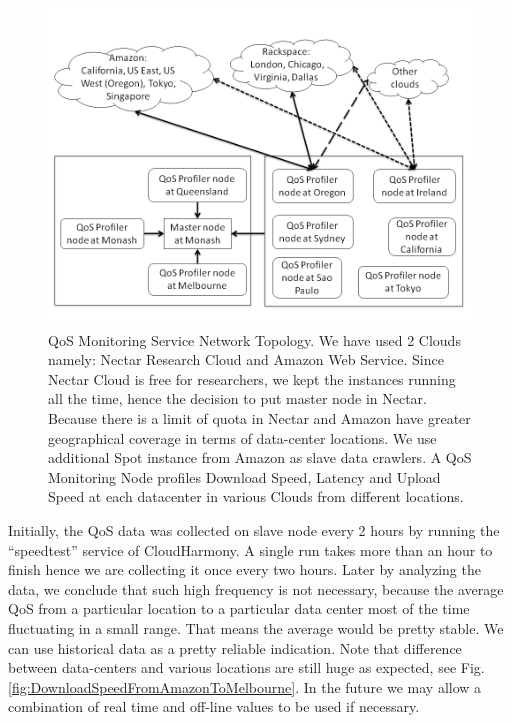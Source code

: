\begin{figure}[!ht]
 \centering
 \includegraphics[width=\textwidth,keepaspectratio]{Figures/QoS/figure2.png}
 \caption{QoS Monitoring Service Network Topology. We have used 2 Clouds namely: Nectar Research Cloud and Amazon Web Service. Since Nectar Cloud is free for researchers, we kept the instances running all the time, hence the decision to put master node in Nectar. Because there is a limit of quota in Nectar and Amazon have greater geographical coverage in terms of data-center locations. We use additional Spot instance from Amazon as slave data crawlers. A QoS Monitoring Node profiles Download Speed, Latency and Upload Speed at each datacenter in various Clouds from different locations.}
\label{fig:QoSMonitoringServiceNetworkTopology}
\end{figure}

Initially, the QoS data was collected on slave node every 2 hours by running the ``speedtest'' service of CloudHarmony. A single run takes more than an hour to finish hence we are collecting it once every two hours. Later by analyzing the data, we conclude that such high frequency is not necessary, because the average QoS from a particular location to a particular data center most of the time fluctuating in a small range. That means the average would be pretty stable. We can use historical data as a pretty reliable indication. Note that difference between data-centers and various locations are still huge as expected, see Fig. \ref{fig:DownloadSpeedFromAmazonToMelbourne}. In the future we may allow a combination of real time and off-line values to be used if necessary.

